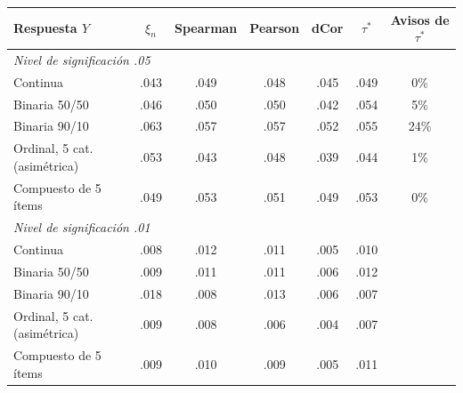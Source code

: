 \begin{tabular}{lcccccc}
\toprule
Respuesta $Y$ & $\xi_n$ & Spearman & Pearson & dCor & $\tau^*$ & Avisos de $\tau^*$ \\
\midrule
\multicolumn{7}{l}{\emph{Nivel de significaci\'on .05}} \\
Continua & .043 & .049 & .048 & .045 & .049 & 0\% \\
Binaria 50/50 & .046 & .050 & .050 & .042 & .054 & 5\% \\
Binaria 90/10 & .063 & .057 & .057 & .052 & .055 & 24\% \\
Ordinal, 5 cat. (asim\'etrica) & .053 & .043 & .048 & .039 & .044 & 1\% \\
Compuesto de 5 \'items & .049 & .053 & .051 & .049 & .053 & 0\% \\
\midrule
\multicolumn{7}{l}{\emph{Nivel de significaci\'on .01}} \\
Continua & .008 & .012 & .011 & .005 & .010 &  \\
Binaria 50/50 & .009 & .011 & .011 & .006 & .012 &  \\
Binaria 90/10 & .018 & .008 & .013 & .006 & .007 &  \\
Ordinal, 5 cat. (asim\'etrica) & .009 & .008 & .006 & .004 & .007 &  \\
Compuesto de 5 \'items & .009 & .010 & .009 & .005 & .011 &  \\
\bottomrule
\end{tabular}
